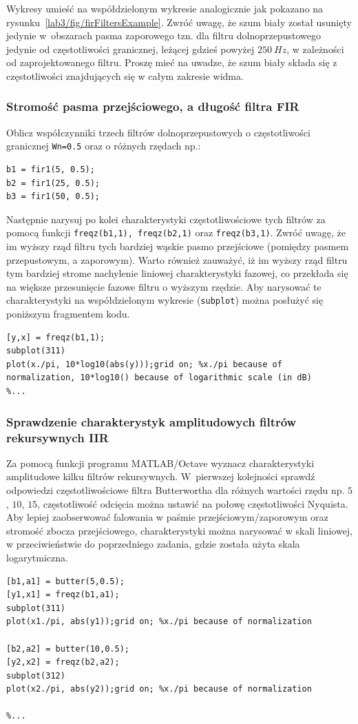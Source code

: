 Wykresy umieść na współdzielonym wykresie analogicznie jak pokazano na rysunku~\ref{lab3/fig/firFiltersExample}. Zwróć uwagę, że szum biały został usunięty jedynie w~obszarach pasma zaporowego tzn. dla filtru dolnoprzepustowego jedynie od częstotliwości granicznej, leżącej gdzieś powyżej $250~Hz$, w zależności od zaprojektowanego filtru. Proszę mieć na uwadze, że szum biały składa się z częstotliwości znajdujących się w całym zakresie widma.



\subsubsection{Stromość pasma przejściowego, a długość filtra FIR}
Oblicz współczynniki trzech filtrów dolnoprzepustowych o częstotliwości granicznej \texttt{Wn=0.5} oraz o różnych rzędach np.: 
\begin{lstlisting}
b1 = fir1(5, 0.5);
b2 = fir1(25, 0.5);
b3 = fir1(50, 0.5);
\end{lstlisting}
Następnie narysuj po kolei charakterystyki częstotliwościowe tych filtrów za pomocą funkcji \texttt{freqz(b1,1), freqz(b2,1)} oraz \texttt{freqz(b3,1)}. Zwróć uwagę, że im wyższy rząd filtru tych bardziej wąskie pasmo przejściowe (pomiędzy pasmem przepustowym, a zaporowym). Warto również zauważyć, iż im wyższy rząd filtru tym bardziej strome nachylenie liniowej charakterystyki fazowej, co przekłada się na większe przesunięcie fazowe filtru o wyższym rzędzie. Aby narysować te charakterystyki na współdzielonym wykresie (\texttt{subplot}) można posłużyć się poniższym fragmentem kodu.
\begin{lstlisting}
[y,x] = freqz(b1,1);
subplot(311)
plot(x./pi, 10*log10(abs(y)));grid on; %x./pi because of normalization, 10*log10() because of logarithmic scale (in dB)
%...
\end{lstlisting}

\subsubsection{Sprawdzenie charakterystyk amplitudowych filtrów rekursywnych IIR}
Za pomocą funkcji programu MATLAB/Octave wyznacz charakterystyki amplitudowe kilku filtrów rekursywnych. W~pierwszej kolejności sprawdź odpowiedzi częstotliwościowe filtra Butterwortha dla różnych wartości rzędu np. $5$, $10$, $15$, częstotliwość odcięcia można ustawić na połowę częstotliwości Nyquista. Aby lepiej zaobserwować falowania w paśmie przejściowym/zaporowym oraz stromość zbocza przejściowego, charakterystyki można narysować w skali liniowej, w przeciwieństwie do poprzedniego zadania, gdzie została użyta skala logarytmiczna.
\begin{lstlisting}
[b1,a1] = butter(5,0.5);
[y1,x1] = freqz(b1,a1);
subplot(311)
plot(x1./pi, abs(y1));grid on; %x./pi because of normalization

[b2,a2] = butter(10,0.5);
[y2,x2] = freqz(b2,a2);
subplot(312)
plot(x2./pi, abs(y2));grid on; %x./pi because of normalization

%...
\end{lstlisting}

